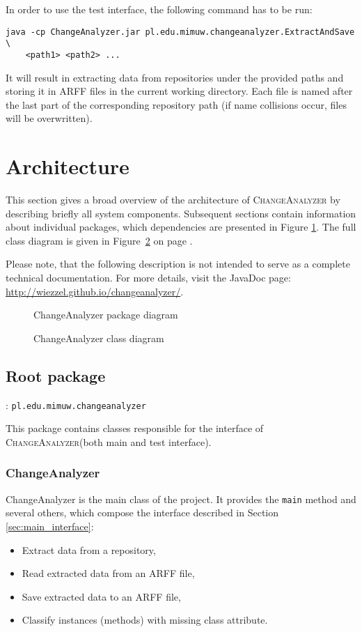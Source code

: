 \documentclass{pracamgr}
\newcommand{\ca}{\textsc{ChangeAnalyzer}\xspace}
\newcommand{\pack}[3]{\subsection{#1 package} \label{sec:#2} \underline{\smash{Full package name}}: \texttt{#3}\medskip}
\begin{document}
In order to use the test interface, the following command has to be run:

\begin{verbatim}
java -cp ChangeAnalyzer.jar pl.edu.mimuw.changeanalyzer.ExtractAndSave \
    <path1> <path2> ...
\end{verbatim}

It will result in extracting data from repositories under the provided paths and storing it in ARFF files in the current working directory. Each file is named after the last part of the corresponding repository path (if name collisions occur, files will be overwritten).

\section{Architecture}
\label{sec:architecture}
This section gives a broad overview of the architecture of \ca by describing briefly all system components. Subsequent sections contain information about individual packages, which dependencies are presented in Figure \ref{fig:package_diagram}. The full class diagram is given in Figure~\ref{fig:class_diagram} on page \pageref{fig:class_diagram}.

Please note, that the following description is not intended to serve as a complete technical documentation. For more details, visit the JavaDoc page: \url{http://wiezzel.github.io/changeanalyzer/}.

\begin{figure}[h!]
\centering

\caption{ChangeAnalyzer package diagram}
\label{fig:package_diagram}
\end{figure}

\begin{figure}[h!]
\begin{adjustwidth}{-2.5cm}{-2.5cm}
\centering

\caption{ChangeAnalyzer class diagram}
\label{fig:class_diagram}
\end{adjustwidth}
\end{figure}

\pack{Root}{root}{pl.edu.mimuw.changeanalyzer}

\noindent This package contains classes responsible for the interface of \ca (both main and test interface).

\subsubsection*{ChangeAnalyzer}
ChangeAnalyzer is the main class of the project. It provides the \texttt{main} method and several others, which compose the interface described in Section \ref{sec:main_interface}:
\begin{itemize}[noitemsep,topsep=1pt]
	\item Extract data from a repository,
    \item Read extracted data from an ARFF file,
    \item Save extracted data to an ARFF file,
    \item Classify instances (methods) with missing class attribute.
\end{itemize}
\end{document}
